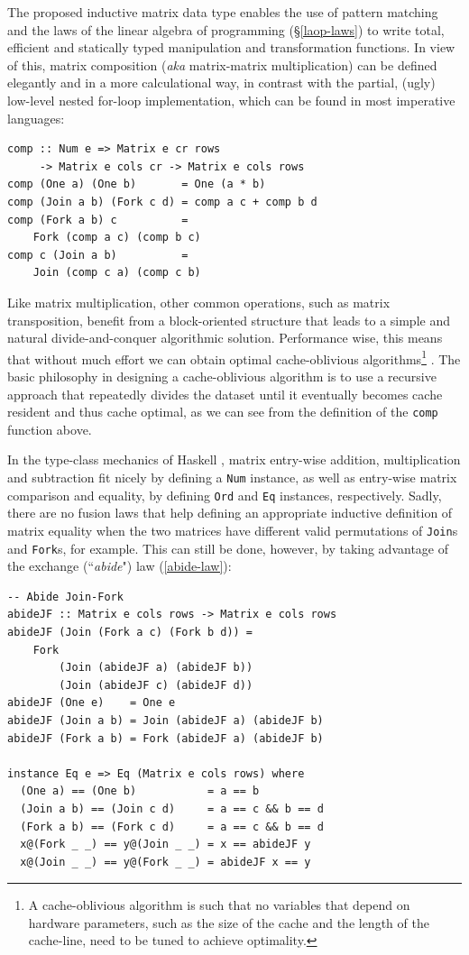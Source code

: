 \documentclass[sigplan]{acmart}\settopmatter{}
\newcommand{\hs}{\texttt}
\begin{document}
The proposed inductive matrix data type enables the use of pattern matching and the laws of the linear algebra of programming (\S\ref{laop-laws}) to write total, efficient and statically typed manipulation and transformation functions. In view of this, matrix composition (\emph{aka} matrix-matrix multiplication) can be defined elegantly and in a more calculational way, in contrast with the partial, (ugly) low-level nested for-loop implementation, which can be found in most imperative languages:
\begin{verbatim}
comp :: Num e => Matrix e cr rows 
     -> Matrix e cols cr -> Matrix e cols rows
comp (One a) (One b)       = One (a * b)
comp (Join a b) (Fork c d) = comp a c + comp b d
comp (Fork a b) c          = 
    Fork (comp a c) (comp b c)
comp c (Join a b)          = 
    Join (comp c a) (comp c b)
\end{verbatim}
Like matrix multiplication, other common operations, such as matrix transposition, benefit from a block-oriented structure that leads to a simple and natural divide-and-conquer algorithmic solution. Performance wise, this means that without much effort we can obtain optimal cache-oblivious algorithms\footnote{A cache-oblivious algorithm is such that no variables that depend on hardware parameters, such as the size of the cache and the length of the cache-line, need to be tuned to achieve optimality.} \citep{frigo1999cache}. The basic philosophy in designing a cache-oblivious algorithm is to use a recursive approach that repeatedly divides the dataset until it eventually becomes cache resident and thus cache optimal, as we can see from the definition of the \hs{comp} function above.

In the type-class mechanics of Haskell \cite{hall1996type}, matrix entry-wise addition, multiplication and subtraction fit nicely by defining a \hs{Num} instance, as well as entry-wise matrix comparison and equality, by defining \hs{Ord} and \hs{Eq} instances, respectively. Sadly, there are no fusion laws that help defining an appropriate inductive definition of matrix equality when the two matrices have different valid permutations of \hs{Join}s and \hs{Fork}s, for example. This can still be done, however, by taking advantage of the exchange (``\emph{abide}") law (\ref{abide-law}):

\vspace{1mm}
\begin{verbatim}
-- Abide Join-Fork
abideJF :: Matrix e cols rows -> Matrix e cols rows
abideJF (Join (Fork a c) (Fork b d)) = 
    Fork 
        (Join (abideJF a) (abideJF b)) 
        (Join (abideJF c) (abideJF d))
abideJF (One e)    = One e
abideJF (Join a b) = Join (abideJF a) (abideJF b)
abideJF (Fork a b) = Fork (abideJF a) (abideJF b)

instance Eq e => Eq (Matrix e cols rows) where
  (One a) == (One b)           = a == b
  (Join a b) == (Join c d)     = a == c && b == d
  (Fork a b) == (Fork c d)     = a == c && b == d
  x@(Fork _ _) == y@(Join _ _) = x == abideJF y
  x@(Join _ _) == y@(Fork _ _) = abideJF x == y
\end{verbatim}
\vspace{1mm}
\end{document}
